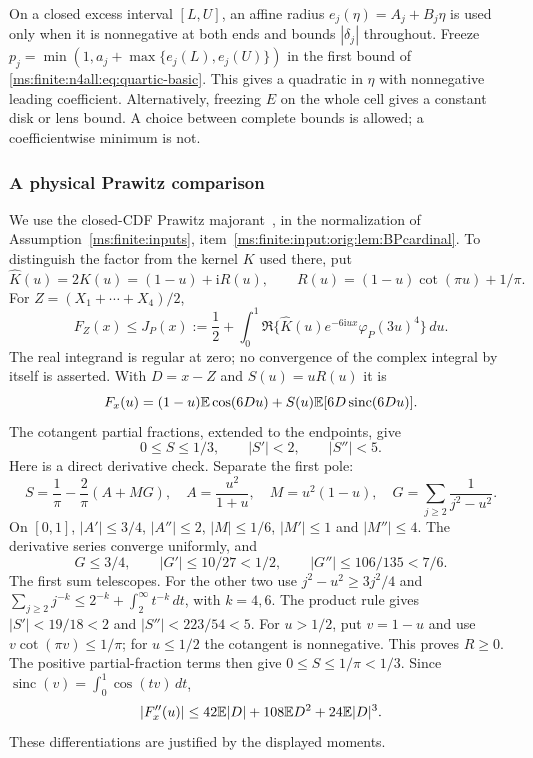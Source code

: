 On a closed excess interval $[L,U]$, an affine radius
$e_j(\eta)=A_j+B_j\eta$ is used only when it is nonnegative at both
ends and bounds $|\delta_j|$ throughout. Freeze
$p_j=\min(1,a_j+\max\{e_j(L),e_j(U)\})$ in the first bound of
\eqref{ms:finite:n4all:eq:quartic-basic}. This gives a quadratic in $\eta$
with nonnegative leading coefficient. Alternatively, freezing $E$
on the whole cell gives a constant disk or lens bound. A choice
between complete bounds is allowed; a coefficientwise minimum is not.

\subsubsection{A physical Prawitz comparison}
We use the closed-CDF Prawitz majorant~\cite{Prawitz1972}, in the
normalization of Assumption~\ref{ms:finite:inputs}, item~\ref{ms:finite:input:orig:lem:BPcardinal}. To distinguish the
factor from the kernel $K$ used there, put
\[
 \widehat K(u)=2K(u)=(1-u)+\mathrm i R(u),\qquad
 R(u)=(1-u)\cot(\pi u)+1/\pi.
\]
For $Z=(X_1+\cdots+X_4)/2$,
\begin{equation}\label{ms:finite:n4all:eq:prawitz}
 F_Z(x)\le J_P(x):=\frac12+
 \int_0^1\Re\{\widehat K(u)e^{-6\mathrm i ux}\varphi_P(3u)^4\}\,du.
\end{equation}
The real integrand is regular at zero; no convergence of the complex
integral by itself is asserted. With $D=x-Z$ and $S(u)=uR(u)$ it is
\[
 F_x(u)=(1-u)\mathbb E\cos(6Du)+S(u)\mathbb E[6D\operatorname{sinc}(6Du)].
\]
The cotangent partial fractions, extended to the endpoints, give
\[
 0\le S\le1/3,\qquad |S'|<2,\qquad |S''|<5.
\]
Here is a direct derivative check. Separate the first pole:
\[
 S=\frac1\pi-\frac2\pi(A+MG),\quad
 A=\frac{u^2}{1+u},\quad M=u^2(1-u),\quad
 G=\sum_{j\ge2}\frac1{j^2-u^2}.
\]
On $[0,1]$, $|A'|\le3/4$, $|A''|\le2$, $|M|\le1/6$,
$|M'|\le1$ and $|M''|\le4$. The derivative series converge
uniformly, and
\[
 G\le3/4,\qquad |G'|\le10/27<1/2,\qquad
 |G''|\le106/135<7/6.
\]
The first sum telescopes. For the other two use
$j^2-u^2\ge3j^2/4$ and
$\sum_{j\ge2}j^{-k}\le2^{-k}+\int_2^\infty t^{-k}\,dt$,
with $k=4,6$. The product rule gives
$|S'|<19/18<2$ and $|S''|<223/54<5$.
For $u>1/2$, put $v=1-u$ and use
$v\cot(\pi v)\le1/\pi$; for $u\le1/2$ the cotangent is
nonnegative. This proves $R\ge0$. The positive partial-fraction
terms then give $0\le S\le1/\pi<1/3$.
Since $\operatorname{sinc}(v)=\int_0^1\cos(tv)\,dt$,
\begin{equation}\label{ms:finite:n4all:eq:integrand-curvature}
 |F_x''(u)|\le42\mathbb E|D|+108\mathbb E D^2+24\mathbb E|D|^3.
\end{equation}
These differentiations are justified by the displayed moments.

